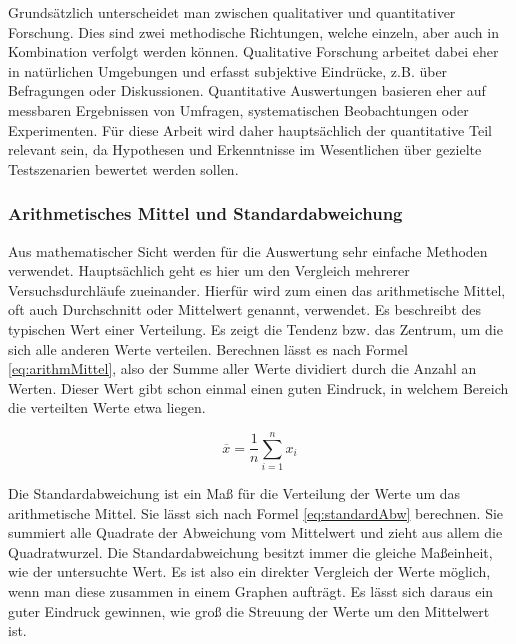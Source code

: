 Grundsätzlich unterscheidet man zwischen qualitativer und quantitativer Forschung. Dies sind zwei methodische Richtungen, welche einzeln, aber auch in Kombination verfolgt werden können. Qualitative Forschung arbeitet dabei eher in natürlichen Umgebungen und erfasst subjektive Eindrücke, z.B. über Befragungen oder Diskussionen. Quantitative Auswertungen basieren eher auf messbaren Ergebnissen von Umfragen, systematischen Beobachtungen oder Experimenten. \cite{qualQuantForschung} Für diese Arbeit wird daher hauptsächlich der quantitative Teil relevant sein, da Hypothesen und Erkenntnisse im Wesentlichen über gezielte Testszenarien bewertet werden sollen.


\subsubsection{Arithmetisches Mittel und Standardabweichung} 

Aus mathematischer Sicht werden für die Auswertung sehr einfache Methoden verwendet. Hauptsächlich geht es hier um den Vergleich mehrerer Versuchsdurchläufe zueinander. Hierfür wird zum einen das arithmetische Mittel, oft auch Durchschnitt oder Mittelwert genannt, verwendet. Es beschreibt des typischen Wert einer Verteilung. Es zeigt die Tendenz bzw. das Zentrum, um die sich alle anderen Werte verteilen. Berechnen lässt es nach Formel \ref{eq:arithmMittel}, also der Summe aller Werte dividiert durch die Anzahl an Werten. Dieser Wert gibt schon einmal einen guten Eindruck, in welchem Bereich die verteilten Werte etwa liegen. \cite{papula}

\begin{equation} \label{eq:arithmMittel}
\overline{x}=\frac{1}{n} \sum_{i=1}^n x_i
\end{equation}


Die Standardabweichung ist ein Maß für die Verteilung der Werte um das arithmetische Mittel. Sie lässt sich nach Formel \ref{eq:standardAbw} berechnen. Sie summiert alle Quadrate der Abweichung vom Mittelwert und zieht aus allem die Quadratwurzel. Die Standardabweichung besitzt immer die gleiche Maßeinheit, wie der untersuchte Wert. Es ist also ein direkter Vergleich der Werte möglich, wenn man diese zusammen in einem Graphen aufträgt. Es lässt sich daraus ein guter Eindruck gewinnen, wie groß die Streuung der Werte um den Mittelwert ist. \cite{papula}

